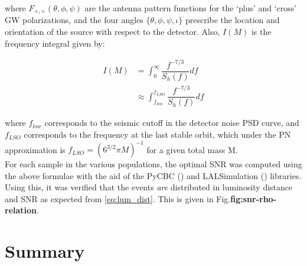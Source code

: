         where $F_{+, \times}(\theta, \phi, \psi)$ are the antenna pattern functions for
        the `plus' and `cross' GW polarizations, and the four angles $\{\theta, \phi,
        \psi, \iota\}$ prescribe the location and orientation of the source with respect
        to the detector. Also, $I(M)$ is the frequency integral given by:

        \begin{align}
                I(M) &= \int_0^\infty \dfrac{f^{-7/3}}{S_h(f)} df \\
                     &\approx \int_{f_{low}}^{f_{LSO}} \dfrac{f^{-7/3}}{S_h(f)} df
        \end{align}

        where $f_{low}$ corresponds to the seismic cutoff in the detector noise PSD
        curve, and $f_{LSO}$ corresponds to the frequency at the last stable orbit,
        which under the PN approximation is $f_{LSO} = (6^{3/2} \pi M)^{-1}$ for a given
        total mass M.\\
        For each sample in the various populations, the optimal SNR was computed using
        the above formulae with the aid of the PyCBC (\cite{pycbc}) and LALSimulation
        (\cite{lalsuite}) libraries. Using this, it was verified that the events
        \textit{are} distributed in luminosity distance and SNR as expected from
        \ref{eq:lum_dist}. This is given in Fig.\textbf{fig:snr-rho-relation}.

\section{Summary}
